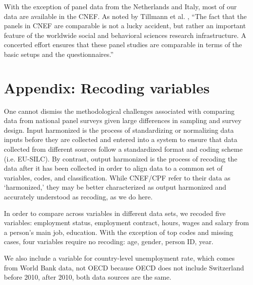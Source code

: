 With the exception of panel data from the Netherlands and Italy, most of our data are available in the CNEF.  As noted by Tillmann et al. \citeyearpar[pg. vii]{tillmann2018social}, ``The fact that the panels in CNEF are comparable is not a lucky accident, but rather an important feature of the worldwide social and behavioral sciences research infrastructure. A concerted effort ensures that these panel studies are comparable in terms of the basic setups and the questionnaires.''  


\clearpage
\setcounter{table}{0}
\setcounter{figure}{0}
\renewcommand*\thetable{\Alph{section}.\arabic{table}}
\renewcommand*\thefigure{\Alph{section}.\arabic{figure}}
\renewcommand{\theHfigure}{\Alph{section}.\arabic{table}}
\renewcommand{\theHtable}{\Alph{section}.\arabic{figure}}

\section{Appendix: Recoding variables}\label{appendix:variables}

One cannot dismiss the methodological challenges associated with comparing data from national panel surveys given large differences in sampling and survey design. Input harmonized is the process of standardizing or normalizing data inputs before they are collected and entered into a system to ensure that data collected from different sources follow a standardized format and coding scheme (i.e. EU-SILC).  By contrast, output harmonized is the process of recoding the data after it has been collected in order to align data to a common set of variables, codes, and classification.  While CNEF/CPF refer to their data as `harmonized,' they may be better characterized as output harmonized and accurately understood as recoding, as we do here.  

In order to compare across variables in different data sets, we recoded five variables: employment status, employment contract, hours, wages and salary from a person's main job, education.  With the exception of top codes and missing cases, four variables require no recoding: age, gender, person ID, year.  

We also include a variable for country-level unemployment rate, which comes from World Bank data, not OECD because OECD does not include Switzerland before 2010, after 2010, both data sources are the same. 

